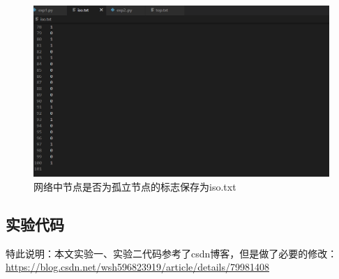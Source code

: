 \documentclass[UTF8]{article} %
\begin{document}
	\begin{figure}[H]
		\centering
		\includegraphics[width=0.7\linewidth]{screenshot005}
		\caption{网络中节点是否为孤立节点的标志保存为iso.txt}
		\label{fig:screenshot005}
	\end{figure}
	

	\subsection{实验代码}
	特此说明：本文实验一、实验二代码参考了csdn博客，但是做了必要的修改：\url{https://blog.csdn.net/wsh596823919/article/details/79981408}
\end{document}
